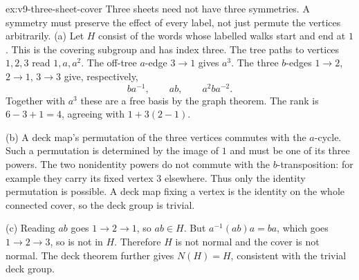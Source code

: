 \begin{solution}{ex:v9-three-sheet-cover}
\idea Three sheets need not have three symmetries. A symmetry must preserve the effect of every label, not just permute the vertices arbitrarily.
\writeup (a) Let $H$ consist of the words whose labelled walks start and end at $1$. This is the covering subgroup and has index three. The tree paths to vertices $1,2,3$ read $1,a,a^2$. The off-tree $a$-edge $3\to1$ gives $a^3$. The three $b$-edges $1\to2$, $2\to1$, $3\to3$ give, respectively,
\[
ba^{-1},\qquad ab,\qquad a^2ba^{-2}.
\]
Together with $a^3$ these are a free basis by the graph theorem. The rank is $6-3+1=4$, agreeing with $1+3(2-1)$.

(b) A deck map's permutation of the three vertices commutes with the $a$-cycle. Such a permutation is determined by the image of $1$ and must be one of its three powers. The two nonidentity powers do not commute with the $b$-transposition: for example they carry its fixed vertex $3$ elsewhere. Thus only the identity permutation is possible. A deck map fixing a vertex is the identity on the whole connected cover, so the deck group is trivial.

(c) Reading $ab$ goes $1\to2\to1$, so $ab\in H$. But $a^{-1}(ab)a=ba$, which goes $1\to2\to3$, so is not in $H$. Therefore $H$ is not normal and the cover is not normal. The deck theorem further gives $N(H)=H$, consistent with the trivial deck group.
\end{solution}

